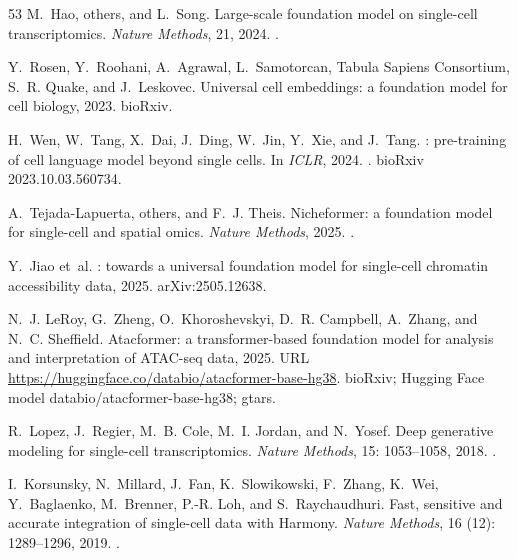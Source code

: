 \documentclass[fleqn,10pt,lineno]{wlpeerj}  %
\begin{document}
\begin{thebibliography}{53}
M.~Hao, others, and L.~Song.
\newblock Large-scale foundation model on single-cell transcriptomics.
\newblock \emph{Nature Methods}, 21, 2024.
\newblock {}.

Y.~Rosen, Y.~Roohani, A.~Agrawal, L.~Samotorcan, {Tabula Sapiens Consortium},
  S.~R. Quake, and J.~Leskovec.
\newblock Universal cell embeddings: a foundation model for cell biology, 2023.
\newblock bioRxiv.

H.~Wen, W.~Tang, X.~Dai, J.~Ding, W.~Jin, Y.~Xie, and J.~Tang.
: pre-training of cell language model beyond single cells.
\newblock In \emph{ICLR}, 2024.
\newblock {}.
\newblock bioRxiv 2023.10.03.560734.

A.~Tejada-Lapuerta, others, and F.~J. Theis.
\newblock Nicheformer: a foundation model for single-cell and spatial omics.
\newblock \emph{Nature Methods}, 2025.
\newblock {}.

Y.~Jiao et~al.
: towards a universal foundation model for single-cell
  chromatin accessibility data, 2025.
\newblock arXiv:2505.12638.

N.~J. LeRoy, G.~Zheng, O.~Khoroshevskyi, D.~R. Campbell, A.~Zhang, and N.~C.
  Sheffield.
\newblock Atacformer: a transformer-based foundation model for analysis and
  interpretation of {ATAC}-seq data, 2025.
\newblock URL \url{https://huggingface.co/databio/atacformer-base-hg38}.
\newblock bioRxiv; Hugging Face model databio/atacformer-base-hg38; gtars.

R.~Lopez, J.~Regier, M.~B. Cole, M.~I. Jordan, and N.~Yosef.
\newblock Deep generative modeling for single-cell transcriptomics.
\newblock \emph{Nature Methods}, 15: 1053--1058, 2018.
\newblock {}.

I.~Korsunsky, N.~Millard, J.~Fan, K.~Slowikowski, F.~Zhang, K.~Wei,
  Y.~Baglaenko, M.~Brenner, P.-R. Loh, and S.~Raychaudhuri.
\newblock Fast, sensitive and accurate integration of single-cell data with
  {Harmony}.
\newblock \emph{Nature Methods}, 16 (12): 1289--1296, 2019.
\newblock {}.


\end{thebibliography}
\end{document}
